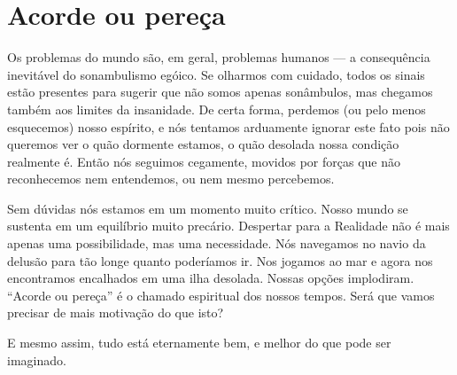 \section*{Acorde ou pereça}

Os problemas do mundo são, em geral, problemas humanos --- a consequência inevitável do sonambulismo egóico. Se olharmos com cuidado, todos os sinais estão presentes para sugerir que não somos apenas sonâmbulos, mas chegamos também aos limites da insanidade. De certa forma, perdemos (ou pelo menos esquecemos) nosso espírito, e nós tentamos arduamente ignorar este fato pois não queremos ver o quão dormente estamos, o quão desolada nossa condição realmente é. Então nós seguimos cegamente, movidos por forças que não reconhecemos nem entendemos, ou nem mesmo percebemos.

Sem dúvidas nós estamos em um momento muito crítico. Nosso mundo se sustenta em um equilíbrio muito precário. Despertar para a Realidade não é mais apenas uma possibilidade, mas uma necessidade. Nós navegamos no navio da delusão para tão longe quanto poderíamos ir. Nos jogamos ao mar e agora nos encontramos encalhados em uma ilha desolada. Nossas opções implodiram. ``Acorde ou pereça'' é o chamado espiritual dos nossos tempos. Será que vamos precisar de mais motivação do que isto?

E mesmo assim, tudo está eternamente bem, e melhor do que pode ser imaginado.
